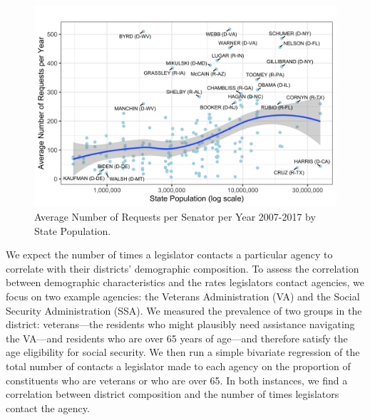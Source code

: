 \documentclass[12pt]{article}
\begin{document}
\begin{figure}
\centering
\caption{Average Number of Requests per Senator per Year 2007-2017 by State Population.} \label{f:stateSize}
\includegraphics[width = \textwidth]{figs/pop-1}
\end{figure}

We expect the number of times a legislator contacts a particular agency to correlate with their districts' demographic composition. To assess the correlation between demographic characteristics and the rates legislators contact agencies, we focus on two example agencies: the Veterans Administration (VA) and the Social Security Administration (SSA). We measured the prevalence of two groups in the district: veterans---the residents who might plausibly need assistance navigating the VA---and residents who are over 65 years of age---and therefore satisfy the age eligibility for social security. We then run a simple bivariate regression of the total number of contacts a legislator made to each agency on the proportion of constituents who are veterans or who are over 65.  
In both instances, we find a correlation between district composition and the number of times legislators contact the agency. 

\end{document}
